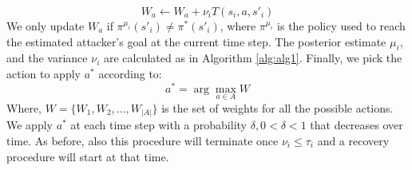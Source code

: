 \documentclass[letterpaper, 10 pt, conference]{ieeeconf}  %
\begin{document}
\begin{equation}  W_a \leftarrow W_a +
                \nu_i T(s_i, a, s'_i)
\label{eqn:active_exlporation}
\end{equation}
We only update $W_a$ if $\pi^{\mu_i}(s'_i) \ne \pi^*(s'_i)$, where $\pi^{\mu_i}$ is the policy used to reach the estimated attacker's goal at the current time step. The posterior estimate $\mu_i$, and the variance $\nu_i$ are calculated as in Algorithm \ref{alg:alg1}. Finally, we pick the action to apply $a^*$ according to:
\begin{equation}  a^*=\arg\!\max_{a\in A}W
\label{eqn:picked_action}
\end{equation}
Where, $W = \{W_1, W_2, ..., W_{|A|}\}$ is the set of weights for all the possible actions. We apply $a^*$ at each time step with a probability $\delta, 0 < \delta < 1$ that decreases over time. 
As before, also this procedure will terminate once $\nu_i\leq\tau_i$ and a recovery procedure will start at that time.
\end{document}
